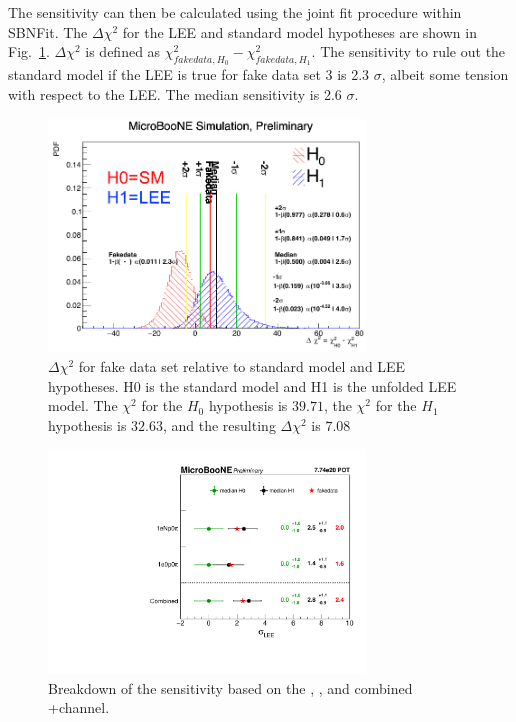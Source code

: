 The sensitivity can then be calculated using the joint fit procedure within SBNFit. The $\Delta \chi^{2}$ for the LEE and standard model hypotheses are shown in Fig.~\ref{fig:fakedata:set3:sens}.  $\Delta \chi^{2}$ is defined as $\chi^{2}_{fakedata, H_{0}}-\chi^{2}_{fakedata, H_{1}}$. The sensitivity to rule out the standard model if the LEE is true for fake data set 3 is 2.3 $\sigma$, albeit some tension with respect to the LEE.  The median sensitivity is 2.6 $\sigma$.

\begin{figure}[H]
\begin{center}
\includegraphics[width=0.75\textwidth]{Fakedata/set3/sens.pdf}
\caption{\label{fig:fakedata:set3:sens} $\Delta \chi^{2}$ for fake data set relative to standard model and LEE hypotheses. H0 is the standard model and H1 is the unfolded LEE model. The $\chi^{2}$ for the $H_0$ hypothesis is $39.71$, the $\chi^{2}$ for the $H_1$ hypothesis is $32.63$, and the resulting $\Delta \chi^{2}$ is $7.08$}
\end{center}
\end{figure}

\begin{figure}[H]
\begin{center}
\includegraphics[width=0.75\textwidth]{Fakedata/set3/plotSig_constrained_set3.pdf}
\caption{\label{fig:fakedata:set3:combinedSig} Breakdown of the sensitivity based on the \npsel, \zpsel, and combined \npsel+\zpsel channel.}
\end{center}
\end{figure}

